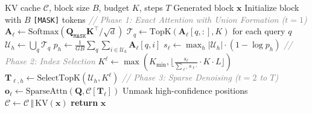\begin{algorithm}[t!]
\small
\caption{MAGE Inference}
\label{alg:mage}
\begin{algorithmic}[1]
\REQUIRE KV cache $\mathcal{C}$, block size $B$, budget $K$, steps $T$
\ENSURE Generated block $\mathbf{x}$
\STATE Initialize block with $B$ \texttt{[MASK]} tokens
\STATE \textit{\textcolor{gray}{// Phase 1: Exact Attention with Union Formation ($t=1$)}}
    \STATE $\mathbf{A}_{\ell} \gets \text{Softmax}(\mathbf{Q}_{\texttt{MASK}} \mathbf{K}^\top / \sqrt{d})$
        \STATE $\mathcal{T}_q \gets \text{TopK}(\mathbf{A}_\ell[q,:], K)$ for each query $q$
        \STATE $\mathcal{U}_h \gets \bigcup_q \mathcal{T}_q$ 
        \STATE $p_h \gets \frac{1}{GB}\sum_q \sum_{i \in \mathcal{U}_h} \mathbf{A}_\ell[q, i]$ 
    \ENDFOR
    \STATE $s_\ell \gets \max_h |\mathcal{U}_h| \cdot (1 - \log p_h)$ 
\ENDFOR
\STATE \textit{\textcolor{gray}{// Phase 2: Index Selection}}
    \STATE $K^\ell \gets \max\left(K_{\min}, \lfloor \frac{s_\ell}{\sum_{\ell'} s_{\ell'}} \cdot K \cdot L \rfloor\right)$
    \STATE $\mathbf{T}_{\ell,h} \gets \text{SelectTopK}(\mathcal{U}_h, K^\ell)$ 
\ENDFOR
\STATE \textit{\textcolor{gray}{// Phase 3: Sparse Denoising ($t=2$ to $T$)}}
        \STATE $\mathbf{o}_{\ell} \gets \text{SparseAttn}(\mathbf{Q}, \mathcal{C}[\mathbf{T}_{\ell}])$
    \ENDFOR
    \STATE Unmask high-confidence positions
\ENDFOR
\STATE $\mathcal{C} \leftarrow \mathcal{C} \,\Vert\, \text{KV}(\mathbf{x})$ 
\STATE \textbf{return} $\mathbf{x}$
\end{algorithmic}
\end{algorithm}